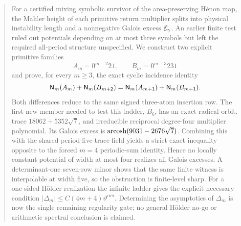 \begin{abstract}
For a certified mixing symbolic survivor of the area-preserving H\'enon map,
the Mahler height of each primitive return multiplier splits into physical
instability length and a nonnegative Galois excess \(\Egal_\gamma\).  An
earlier finite test ruled out potentials depending on at most three symbols
but left the required all-period structure unspecified.  We construct two
explicit primitive families
\[
 A_m=0^{m-2}21,\qquad B_m=0^{m-3}231
\]
and prove, for every \(m\geq3\), the exact cyclic incidence identity
\[
 \Nblk_m(A_m)+\Nblk_m(B_{m+2})
 =\Nblk_m(A_{m+1})+\Nblk_m(B_{m+1}).
\]
Both differences reduce to the same signed three-atom insertion row.  The
first new member needed to test this ladder, \(B_6\), has an exact radical
orbit, trace \(18062+5352\sqrt7\), and irreducible reciprocal degree-four
multiplier polynomial.  Its Galois excess is
\(\acosh(9031-2676\sqrt7)\).  Combining this with the shared period-five
trace field yields a strict exact inequality opposite to the forced
\(m=4\) periodic-sum identity.  Hence no locally constant potential of
width at most four realizes all Galois excesses.  A determinant-one
seven-row minor shows that the same finite witness is interpolable at width
five, so the obstruction is finite-level sharp.  For a one-sided H\"older
realization the infinite ladder gives the explicit necessary condition
\(|\Delta_m|\leq C(4m+4)\vartheta^{\alpha m}\).  Determining the asymptotics
of \(\Delta_m\) is now the single remaining regularity gate; no general
H\"older no-go or arithmetic spectral conclusion is claimed.
\end{abstract}
